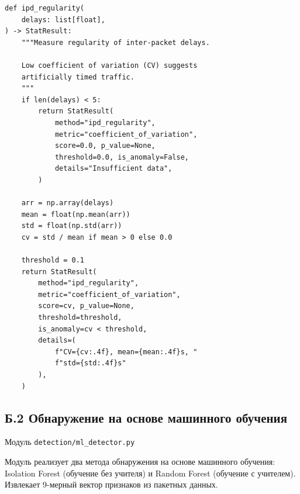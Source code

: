 \begin{lstlisting}[style=appendixcode]
def ipd_regularity(
    delays: list[float],
) -> StatResult:
    """Measure regularity of inter-packet delays.

    Low coefficient of variation (CV) suggests
    artificially timed traffic.
    """
    if len(delays) < 5:
        return StatResult(
            method="ipd_regularity",
            metric="coefficient_of_variation",
            score=0.0, p_value=None,
            threshold=0.0, is_anomaly=False,
            details="Insufficient data",
        )

    arr = np.array(delays)
    mean = float(np.mean(arr))
    std = float(np.std(arr))
    cv = std / mean if mean > 0 else 0.0

    threshold = 0.1
    return StatResult(
        method="ipd_regularity",
        metric="coefficient_of_variation",
        score=cv, p_value=None,
        threshold=threshold,
        is_anomaly=cv < threshold,
        details=(
            f"CV={cv:.4f}, mean={mean:.4f}s, "
            f"std={std:.4f}s"
        ),
    )
\end{lstlisting}

\newpage
\subsection*{Б.2 Обнаружение на основе машинного обучения}
\noindent Модуль \texttt{detection/ml\_detector.py}

Модуль реализует два метода обнаружения на основе машинного обучения:
Isolation Forest (обучение без учителя) и Random Forest (обучение
с учителем). Извлекает 9-мерный вектор признаков из пакетных данных.

